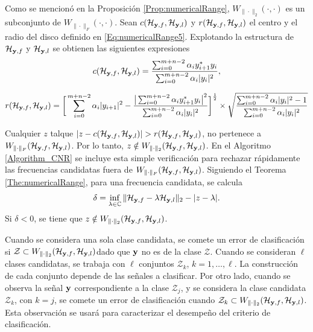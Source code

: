 			Como se mencionó en la Proposición \eqref{Prop:numericalRange}, $W_{\|\cdot\|_2}(\cdot,\cdot)$ es un subconjunto de $W_{\|\cdot\|_F}(\cdot,\cdot)$. Sean $c(\mathcal{H}_{\mathbf{y},f},\mathcal{H}_{\mathbf{y},l})$ y $r(\mathcal{H}_{\mathbf{y},f},\mathcal{H}_{\mathbf{y},l})$ el centro y el radio del disco definido en \eqref{Eq:numericalRange5}. Explotando la estructura de $\mathcal{H}_{\mathbf{y},f}$ y $\mathcal{H}_{\mathbf{y},l}$ se obtienen las siguientes expresiones
			\begin{equation}
				c(\mathcal{H}_{\mathbf{y},f},\mathcal{H}_{\mathbf{y},l}) = \frac{\sum_{i=0}^{m+n-2}\alpha_iy_{i+1}^*y_i}{\sum_{i=0}^{m+n-2}\alpha_i|y_i|^2},
				\label{Eq:numericalRange6}
			\end{equation}
			
			\begin{equation}
				\begin{aligned}
					r(\mathcal{H}_{\mathbf{y},f},\mathcal{H}_{\mathbf{y},l}) = \bigg[\sum_{i=0}^{m+n-2}\alpha_i|y_{i+1}|^2 - \frac{\big|\sum_{i=0}^{m+n-2}\alpha_iy_{i+1}^*y_i\big|^2}{\sum_{i=0}^{m+n-2}\alpha_i|y_i|^2}\bigg]^{\frac{1}{2}}\times\sqrt{\frac{\sum_{i=0}^{m+n-2}\alpha_i|y_i|^2-1}{\sum_{i=0}^{m+n-2}\alpha_i|y_i|^2}}
				\end{aligned}
				\label{Eq:numericalRange7}
			\end{equation}
			
			Cualquier $z$ talque $|z-c(\Hank_{\y,f},\Hank_{\y,l})|>r(\Hank_{\y,f},\Hank_{\y,l})$, no pertenece a $W_{\|\cdot\|_F}(\mathcal{H}_{\mathbf{y},f},\mathcal{H}_{\mathbf{y},l})$. Por lo tanto, $z\notin W_{\|\cdot\|_2}(\mathcal{H}_{\mathbf{y},f},\mathcal{H}_{\mathbf{y},l})$. En el Algoritmo \eqref{Algorithm_CNR} se incluye esta simple verificación para rechazar rápidamente las frecuencias candidatas fuera de $W_{\|\cdot\|_F}(\mathcal{H}_{\mathbf{y},f},\mathcal{H}_{\mathbf{y},l})$. Siguiendo el Teorema \eqref{The:numericalRange}, para una frecuencia candidata, se calcula
			\[\delta = \inf_{\lambda\in\mathbb{C}}\|\mathcal{H}_{\mathbf{y},f}-\lambda\mathcal{H}_{\mathbf{y},l}\|_2 - |z-\lambda|.\]
			Si $\delta<0$, se tiene que $z\notin W_{\|\cdot\|_2}(\mathcal{H}_{\mathbf{y},f},\mathcal{H}_{\mathbf{y},l})$.
			
			Cuando se considera una sola clase candidata, se comete un error de clasificación si $\mathcal{Z}\subset W_{\|\cdot\|_2}(\mathcal{H}_{\mathbf{y},f},\mathcal{H}_{\mathbf{y},l})$dado que $\mathbf{y}$ no es de la clase $\mathcal{Z}$. Cuando se consideran $\ell$ clases candidatas, se trabaja con $\ell$ conjuntos $\mathcal{Z}_{k}$, $k = 1,\ldots,\ell$. La construcción de cada conjunto depende de las señales a clasificar. Por otro lado, cuando se observa la señal $\mathbf{y}$ correspondiente a la clase $\mathcal{Z}_j$, y se considera la clase candidata $\mathcal{Z}_k$, con $k=j$, se comete un error de clasificación cuando $\mathcal{Z}_k\subset W_{\|\cdot\|_2}(\mathcal{H}_{\mathbf{y},f},\mathcal{H}_{\mathbf{y},l})$. Esta observación se usará para caracterizar el desempeño del criterio de clasificación.
			
